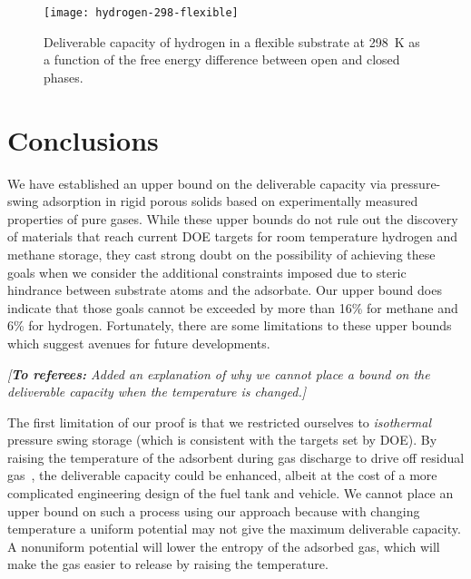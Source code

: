 \documentclass[twoside,twocolumn,9pt]{article}
\newcommand\startreferees[1]{\cbstart \noindent\textit{\color{red}%
[\textbf{To referees:} #1]}

}
\newcommand\donereferees{\cbend}
\begin{document}
\begin{figure}
    \centering
    \texttt{[image: hydrogen-298-flexible]}
    \caption{Deliverable capacity of hydrogen in a flexible substrate at 298\ K as a function of the free energy difference 
      between open and closed phases.}
    \label{fig:hydrogen-flexible}
\end{figure}

\donereferees

\section{Conclusions}
We have established an upper bound on the deliverable capacity via
pressure-swing adsorption in rigid porous solids based on experimentally
measured properties of pure gases. While these upper bounds do not rule out the
discovery of materials that reach current DOE targets for room temperature hydrogen and methane storage, they cast strong doubt
on the possibility of achieving these goals when we consider the additional
constraints imposed due to steric hindrance between substrate atoms and the
adsorbate. Our upper bound does indicate that those goals cannot be exceeded by
more than 16\% for methane and 6\% for hydrogen. Fortunately, there are some
limitations to these upper bounds which suggest avenues for future developments.

\startreferees{Added an explanation of why we cannot place a bound on the
  deliverable capacity when the temperature is changed.}

The first limitation of our proof is that we restricted ourselves to
\emph{isothermal} pressure swing storage (which is consistent with the targets set by DOE). By raising the temperature of the
adsorbent during gas discharge to drive off residual
gas~\cite{gomez2014exploring}, the deliverable capacity could be enhanced,
albeit at the cost of a more complicated engineering design of the fuel tank
and vehicle.
%
We cannot place an upper bound on such a process using our approach because with
changing temperature a uniform potential may not give the maximum deliverable
capacity.  A nonuniform potential will lower the entropy of the adsorbed gas,
which will make the gas easier to release by raising the temperature.

\donereferees
\end{document}
